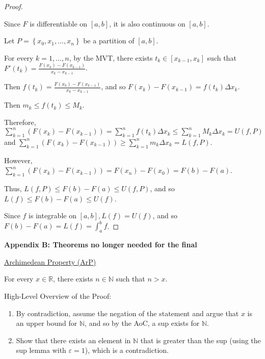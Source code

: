 \documentclass[12pt]{article}
\newcommand{\RR}{\mathbb{R}} %
\newcommand{\NN}{\mathbb{N}}
\newcommand\set[1]{\left\lbrace #1 \right\rbrace} %
\newcommand{\eps}{\varepsilon}
\begin{document}
\begin{proof}
$ $

Since $F$ is differentiable on $[a, b]$, it is also continuous on $[a, b]$.

Let $P = \set{x_0, x_1, \dots, x_n}$ be a partition of $[a, b]$.

For every $k = 1, \dots, n$, by the MVT, there exists $t_k \in [x_{k - 1}, x_k]$ such that
\\
$F'(t_k) = \frac{F(x_k) - F(x_{k - 1})}{x_k - x_{k - 1}}$.

Then $f(t_k) = \frac{F(x_k) - F(x_{k - 1})}{x_k - x_{k - 1}}$, and so $F(x_k) - F(x_{k - 1}) = f(t_k) \Delta x_k$.

Then $m_k \le f(t_k) \le M_k$.

Therefore, $\sum_{k = 1}^n (F(x_k) - F(x_{k - 1})) = \sum_{k = 1}^n f(t_k) \Delta x_k \le \sum_{k = 1}^n M_k \Delta x_k = U(f, P)$ and $\sum_{k = 1}^n (F(x_k) - F(x_{k - 1})) \ge \sum_{k = 1}^n m_k \Delta x_k = L(f, P)$.

However, $\sum_{k = 1}^n (F(x_k) - F(x_{k - 1})) = F(x_n) - F(x_0) = F(b) - F(a)$.

Thus, $L(f, P) \le F(b) - F(a) \le U(f, P)$, and so $L(f) \le F(b) - F(a) \le U(f)$.

Since $f$ is integrable on $[a, b], L(f) = U(f)$, and so $F(b) - F(a) = L(f) = \int_a^b f$.
\end{proof}

\pagebreak

\textbf{Appendix B: Theorems no longer needed for the final}

\hrulefill

\underline{Archimedean Property (ArP)}

For every $x \in \RR$, there exists $n \in \NN$ such that $n > x$.

\dotfill

High-Level Overview of the Proof:

\begin{enumerate}
\item By contradiction, assume the negation of the statement and argue that $x$ is an upper bound for $\NN$, and so by the AoC, a sup exists for $\NN$.

\item Show that there exists an element in $\NN$ that is greater than the sup (using the sup lemma with $\eps = 1$), which is a contradiction.
\end{enumerate}

\dotfill
\end{document}
